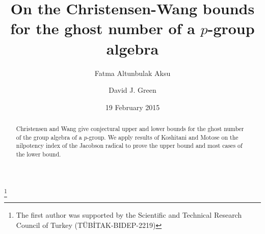 \documentclass[12pt,reqno]{amsart}
\theoremstyle{definition}
\theoremstyle{remark}
\begin{document}
\title[Ghost Number]{On the Christensen-Wang  bounds for the ghost number of a $p$-group algebra}

\author[F.~Altunbulak Aksu]{Fatma Altunbulak Aksu}


\thanks{The first author was supported by  the Scientific and Technical Research Council
of Turkey (T\"UB\.ITAK-BIDEP-2219)}
\address{Dept of Mathematics and Computer Science\\ {\c C}ankaya University\\ 
06790 Ankara \\ Turkey
}

\author[D.~J. Green]{David J. Green}
\address{Dept of Mathematics \\
Friedrich-Schiller-Universit\"at Jena \\ 07737 Jena \\ Germany}


\date{19 February 2015}

\dedicatory{}

\commby{}

\begin{abstract}
Christensen and Wang give conjectural upper and lower bounds for the ghost number of the group algebra of a $p$-group. We apply results of Koshitani and Motose on the nilpotency index of the Jacobson radical to prove the upper bound and most cases of the lower bound.

\end{abstract}
\end{document}
